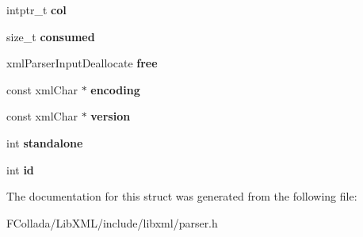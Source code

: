 \begin{DoxyCompactItemize}
\item 
\hypertarget{struct__xmlParserInput_a4df48ff14aea47148699f8c751ffde21}{
intptr\_\-t {\bfseries col}}
\label{struct__xmlParserInput_a4df48ff14aea47148699f8c751ffde21}

\item 
\hypertarget{struct__xmlParserInput_ac423d3067cebd2db61003e125414834a}{
size\_\-t {\bfseries consumed}}
\label{struct__xmlParserInput_ac423d3067cebd2db61003e125414834a}

\item 
\hypertarget{struct__xmlParserInput_a7c55373e42c374bc9df1c542274398fa}{
xmlParserInputDeallocate {\bfseries free}}
\label{struct__xmlParserInput_a7c55373e42c374bc9df1c542274398fa}

\item 
\hypertarget{struct__xmlParserInput_a5584d583c2961fad2f63fef889363cbf}{
const xmlChar $\ast$ {\bfseries encoding}}
\label{struct__xmlParserInput_a5584d583c2961fad2f63fef889363cbf}

\item 
\hypertarget{struct__xmlParserInput_ac15a9de83b0f6bee277164b50f0e2e41}{
const xmlChar $\ast$ {\bfseries version}}
\label{struct__xmlParserInput_ac15a9de83b0f6bee277164b50f0e2e41}

\item 
\hypertarget{struct__xmlParserInput_a2799e20f843ea79b753d9f8b60d4b793}{
int {\bfseries standalone}}
\label{struct__xmlParserInput_a2799e20f843ea79b753d9f8b60d4b793}

\item 
\hypertarget{struct__xmlParserInput_a20347691b442d481465e18f6777efecd}{
int {\bfseries id}}
\label{struct__xmlParserInput_a20347691b442d481465e18f6777efecd}

\end{DoxyCompactItemize}


The documentation for this struct was generated from the following file:\begin{DoxyCompactItemize}
\item 
FCollada/LibXML/include/libxml/parser.h\end{DoxyCompactItemize}
